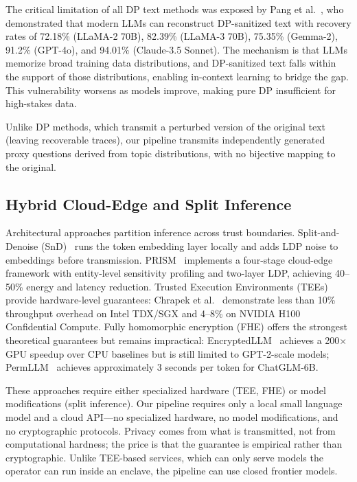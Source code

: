 \documentclass[sigconf,balance=false]{acmart}
\begin{document}
The critical limitation of all DP text methods was exposed by Pang et al.~\cite{pang2024}, who demonstrated that modern LLMs can reconstruct DP-sanitized text with recovery rates of 72.18\% (LLaMA-2 70B), 82.39\% (LLaMA-3 70B), 75.35\% (Gemma-2), 91.2\% (GPT-4o), and 94.01\% (Claude-3.5 Sonnet).
The mechanism is that LLMs memorize broad training data distributions, and DP-sanitized text falls within the support of those distributions, enabling in-context learning to bridge the gap.
This vulnerability worsens as models improve, making pure DP insufficient for high-stakes data.

Unlike DP methods, which transmit a perturbed version of the original text (leaving recoverable traces), our pipeline transmits independently generated proxy questions derived from topic distributions, with no bijective mapping to the original.

\subsection{Hybrid Cloud-Edge and Split Inference}
\label{sec:rw-split}

Architectural approaches partition inference across trust boundaries.
Split-and-Denoise (SnD)~\cite{snd2023} runs the token embedding layer locally and adds LDP noise to embeddings before transmission.
PRISM~\cite{zhan2025} implements a four-stage cloud-edge framework with entity-level sensitivity profiling and two-layer LDP, achieving 40--50\% energy and latency reduction.
Trusted Execution Environments (TEEs) provide hardware-level guarantees: Chrapek et al.~\cite{chrapek2025} demonstrate less than 10\% throughput overhead on Intel TDX/SGX and 4--8\% on NVIDIA H100 Confidential Compute.
Fully homomorphic encryption (FHE) offers the strongest theoretical guarantees but remains impractical: EncryptedLLM~\cite{decastro2025} achieves a 200$\times$ GPU speedup over CPU baselines but is still limited to GPT-2-scale models; PermLLM~\cite{zheng2024} achieves approximately 3 seconds per token for ChatGLM-6B.

These approaches require either specialized hardware (TEE, FHE) or model modifications (split inference).
Our pipeline requires only a local small language model and a cloud API---no specialized hardware, no model modifications, and no cryptographic protocols.
Privacy comes from what is transmitted, not from computational hardness; the price is that the guarantee is empirical rather than cryptographic. Unlike TEE-based services, which can only serve models the operator can run inside an enclave, the pipeline can use closed frontier models.
\end{document}
